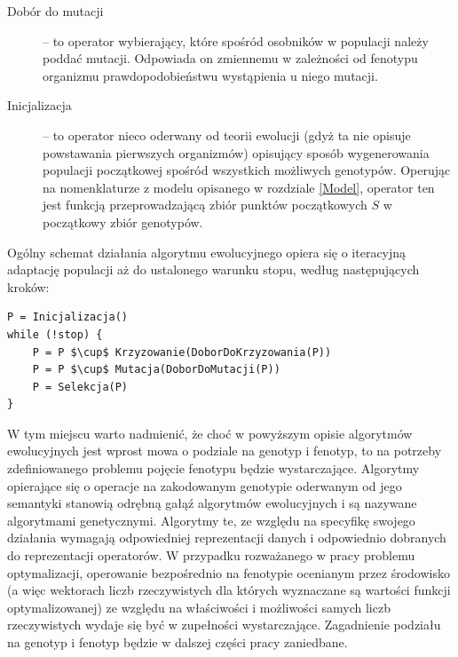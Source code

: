 \documentclass[12pt,a4paper]{report}
\begin{document}
{{{\begin{description}
  \item[Dobór do mutacji] -- to operator wybierający, które spośród osobników w populacji należy poddać mutacji. Odpowiada on zmiennemu w zależności od fenotypu organizmu prawdopodobieństwu wystąpienia u niego mutacji.
  \item[Inicjalizacja] -- to operator nieco oderwany od teorii ewolucji (gdyż ta nie opisuje powstawania pierwszych organizmów) opisujący sposób wygenerowania populacji początkowej spośród wszystkich możliwych genotypów. Operując na nomenklaturze z modelu opisanego w rozdziale \ref{Model}, operator ten jest funkcją przeprowadzającą zbiór punktów początkowych $S$ w początkowy zbiór genotypów.
\end{description}
}
\par{
Ogólny schemat działania algorytmu ewolucyjnego opiera się o iteracyjną adaptację populacji aż do ustalonego warunku stopu, według następujących kroków:
\lstset{language=C}
\begin{lstlisting}[frame=single,mathescape]
P = Inicjalizacja()
while (!stop) {
	P = P $\cup$ Krzyzowanie(DoborDoKrzyzowania(P))
	P = P $\cup$ Mutacja(DoborDoMutacji(P))
	P = Selekcja(P)
}
\end{lstlisting}
}
\par{
W tym miejscu warto nadmienić, że choć w powyższym opisie algorytmów ewolucyjnych jest wprost mowa o podziale na genotyp i fenotyp, to na potrzeby zdefiniowanego problemu pojęcie fenotypu będzie wystarczające. Algorytmy opierające się o operacje na zakodowanym genotypie oderwanym od jego semantyki stanowią odrębną gałąź algorytmów ewolucyjnych i są nazywane algorytmami genetycznymi. Algorytmy te, ze względu na specyfikę swojego działania wymagają odpowiedniej reprezentacji danych i odpowiednio dobranych do reprezentacji operatorów. W przypadku rozważanego w pracy problemu optymalizacji, operowanie bezpośrednio na fenotypie ocenianym przez środowisko (a więc wektorach liczb rzeczywistych dla których wyznaczane są wartości funkcji optymalizowanej) ze względu na właściwości i możliwości samych liczb rzeczywistych wydaje się być w zupełności wystarczające. Zagadnienie podziału na genotyp i fenotyp będzie w dalszej części pracy zaniedbane.
}
}}
\end{document}
